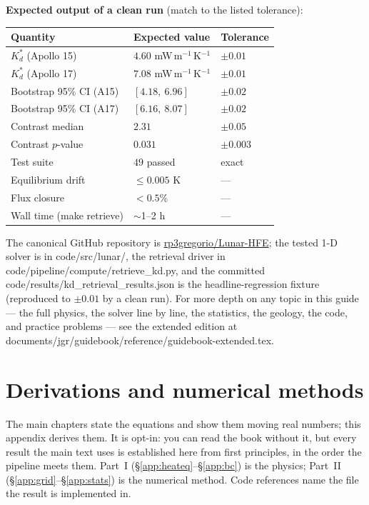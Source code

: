 \documentclass[11pt]{report}
\newcommand{\code}[1]{{\ttfamily\small #1}}
\begin{document}
\noindent\textbf{Expected output of a clean run} (match to the listed tolerance):
\begin{center}\small
\begin{tabular}{@{}lll@{}}
\toprule
Quantity & Expected value & Tolerance \\
\midrule
$K_d^{*}$ (Apollo 15) & $4.60$ mW\,m$^{-1}$\,K$^{-1}$ & $\pm 0.01$ \\
$K_d^{*}$ (Apollo 17) & $7.08$ mW\,m$^{-1}$\,K$^{-1}$ & $\pm 0.01$ \\
Bootstrap 95\% CI (A15) & $[4.18,\ 6.96]$ & $\pm 0.02$ \\
Bootstrap 95\% CI (A17) & $[6.16,\ 8.07]$ & $\pm 0.02$ \\
Contrast median & $2.31$ & $\pm 0.05$ \\
Contrast $p$-value & $0.031$ & $\pm 0.003$ \\
Test suite & $49$ passed & exact \\
Equilibrium drift & $\le 0.005$ K & --- \\
Flux closure & $< 0.5\%$ & --- \\
Wall time (\code{make retrieve}) & $\sim$1--2 h & --- \\
\bottomrule
\end{tabular}
\end{center}

\noindent The canonical GitHub repository is
\href{https://github.com/rp3gregorio/Lunar-HFE}{rp3gregorio/Lunar-HFE}; the
tested 1-D solver is in \code{code/src/lunar/}, the retrieval driver in
\code{code/pipeline/compute/retrieve\_kd.py}, and the committed
\code{code/results/kd\_retrieval\_results.json} is the headline-regression fixture
(reproduced to $\pm0.01$ by a clean run). For more depth on any topic in this
guide --- the full physics, the solver line by line, the statistics, the geology,
the code, and practice problems --- see the extended edition at
\code{documents/jgr/guidebook/reference/guidebook-extended.tex}.

\chapter{Derivations and numerical methods}\label{app:deriv}
The main chapters state the equations and show them moving real numbers; this
appendix derives them. It is opt-in: you can read the book without it, but every
result the main text uses is established here from first principles, in the order
the pipeline meets them. Part~I (\S\ref{app:heateq}--\S\ref{app:bc}) is the
physics; Part~II (\S\ref{app:grid}--\S\ref{app:stats}) is the numerical method.
Code references name the file the result is implemented in.
\end{document}
